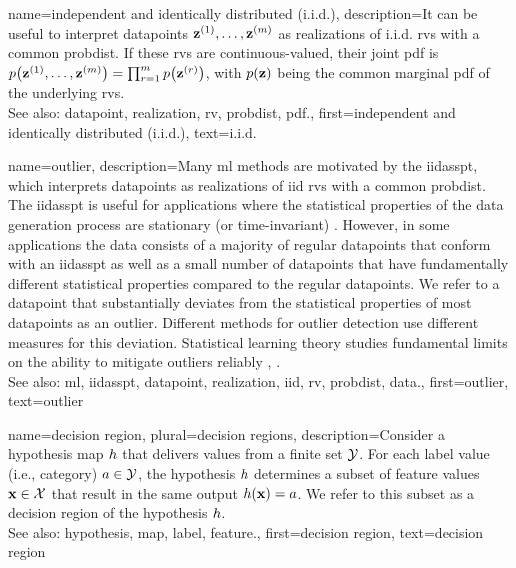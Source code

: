{name={independent and identically distributed (i.i.d.)}, 
	description={It can be useful to 
		interpret \glspl{datapoint} ${\bf z}^{(1)},\ldots,{\bf z}^{(m)}$ 
		as \glspl{realization} of i.i.d. \glspl{rv} with 
		a common \gls{probdist}. If these \glspl{rv} are continuous-valued, their joint \gls{pdf} 
		is $p\big({\bf z}^{(1)},\ldots,{\bf z}^{(m)} \big) = \prod_{r=1}^{m} p \big({\bf z}^{(r)}\big)$, 
		with $p({\bf z})$ being the common 
		marginal \gls{pdf} of the underlying \glspl{rv}.
				\\
		See also: \gls{datapoint}, \gls{realization}, \gls{rv}, \gls{probdist}, \gls{pdf}.},
	first={independent and identically distributed (i.i.d.)},
	text={{i.i.d.}} 
}


{name={outlier}, 
	description={Many \gls{ml} methods 
		are motivated by the \gls{iidasspt}, which interprets \glspl{datapoint} as \glspl{realization} of 
		\gls{iid} \glspl{rv} with a common \gls{probdist}. The \gls{iidasspt} is useful for applications  
		where the statistical properties of the \gls{data} generation process are stationary (or time-invariant) \cite{Brockwell91}. 
		However, in some applications the \gls{data} consists of a majority of regular \glspl{datapoint} 
		that conform with an \gls{iidasspt} as well as a small number of \glspl{datapoint} that have fundamentally different 
       		statistical properties compared to the regular \glspl{datapoint}. We refer to a \gls{datapoint} that 
        		substantially deviates from the statistical properties of most \glspl{datapoint} as an 
        		outlier. Different methods for outlier detection use different measures for this deviation. 
        		Statistical learning theory studies fundamental limits on the ability to mitigate outliers reliably \cite{doi:10.1137/0222052}, \cite{10.1214/20-AOS1961}.
        		\\
		See also: \gls{ml}, \gls{iidasspt}, \gls{datapoint}, \gls{realization}, \gls{iid}, \gls{rv}, \gls{probdist}, \gls{data}.},
	 first={outlier},
	 text={outlier} 
}

{name={decision region}, plural={decision regions}, 
	description={Consider 
		a \gls{hypothesis} \gls{map} $h$ that delivers values from a finite set $\mathcal{Y}$. 
		For each \gls{label} value (i.e., category) $a \in \mathcal{Y}$, the \gls{hypothesis} $h$ 
		determines a subset of \gls{feature} values ${\bf x} \in \mathcal{X}$ that result 
		in the same output $h({\bf x})=a$. We refer to this subset as a decision 
		region of the \gls{hypothesis} $h$.
				\\
		See also: \gls{hypothesis}, \gls{map}, \gls{label}, \gls{feature}.},
	first={decision region},
	text={decision region} 
}


